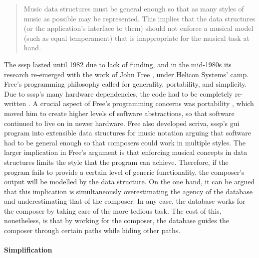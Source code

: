 	\begin{quote}
		Music data structures must be general enough so that as many styles of music as possible may be represented. This implies that the data structures (or the application's interface to them) should not enforce a musical model (such as equal temperament) that is inappropriate for the musical task at hand. \parencite[318]{icmc/bbp2372.1987.046}
	\end{quote}

	The \gls{sssp} lasted until 1982 due to lack of funding, and in the mid-1980s its research re-emerged with the work of John Free \parencite{icmc/bbp2372.1987.046}, under Helicon Systems' \gls{camp}. Free's programming philosophy called for generality, portability, and simplicity. Due to \gls{sssp}'s many hardware dependencies, the code had to be completely re-written \parencite{DBLP:conf/icmc/FreeV86}. A crucial aspect of Free's programming concerns was portability , which moved him to create higher levels of software abstractions, so that software continued to live on in newer hardware. Free also developed \gls{scriva}, \gls{sssp}'s \gls{gui} program into extensible data structures for music notation arguing that software had to be general enough so that composers could work in multiple styles. The larger implication in Free's argument is that enforcing musical concepts in data structures limits the style that the program can achieve. Therefore, if the program fails to provide a certain level of generic functionality, the composer's output will be modelled by the data structure. On the one hand, it can be argued that this implication is simultaneously overestimating the agency of the database and underestimating that of the composer. In any case, the database works for the composer by taking care of the more tedious task. The cost of this, nonetheless, is that by working for the composer, the database guides the composer through certain paths while hiding other paths.

	\paragraph{Simplification}
	\label{computer:vanilla}


